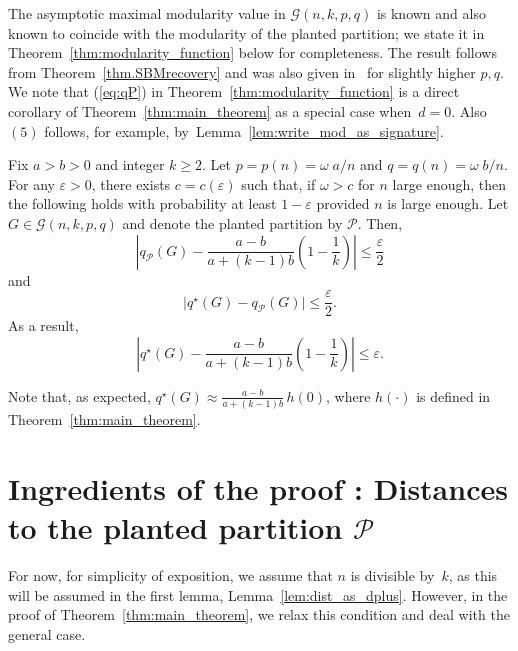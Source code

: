 \documentclass[a4paper,UKenglish,cleveref, autoref, thm-restate,numberwithinsect]{lipics-v2021}
\newcommand{\cP}{\mathcal{P}}
\newcommand{\q}{q^{\star}}
\newcommand{\eps}{\varepsilon}
\begin{document}
The asymptotic maximal modularity value in $\mathcal{G}(n,k,p,q)$ is known and also known to coincide with the modularity of the planted partition; we state it in Theorem~\ref{thm:modularity_function} below for completeness. The result follows from Theorem~\ref{thm.SBMrecovery} and was also given in~\cite{sampling} for slightly higher $p,q$. We note that (\ref{eq:qP}) in Theorem~\ref{thm:modularity_function} is a direct corollary of Theorem~\ref{thm:main_theorem} as a special case when~$d=0$. Also~$(5)$ follows, for example, by~Lemma~\ref{lem:write_mod_as_signature}.

\begin{theorem}\label{thm:modularity_function} 
Fix $a>b>0$ and integer $k\geq 2$. Let $p=p(n)=\omega\; a / n$ and $q=q(n)=\omega \; b/n$. For any $\eps>0$, there exists $c=c(\eps)$ such that, if $\omega>c$ for $n$ large enough, then the following holds with probability at least $1-\eps$ provided $n$ is large enough.
%
Let $G \in \mathcal{G}(n,k,p,q)$ and denote the planted partition by $\cP$. Then,
\begin{equation}\label{eq:qP}
\left| q_\cP(G)  - \frac {a-b}{a+(k-1)b} \left( 1 - \frac {1}{k} \right) \right| \le \frac {\eps}{2}
\end{equation}
and 
\begin{equation}\label{eq:q*}
\Big| q^{\star}(G) - q_\cP(G) \Big| \le \frac {\eps}{2}.
\end{equation}
As a result, 
$$
\left| q^{\star}(G)  - \frac {a-b}{a+(k-1)b} \left( 1 - \frac {1}{k} \right) \right| \le \eps.
$$
\end{theorem}
%
Note that, as expected, $\q(G)\approx \frac {a-b}{a+(k-1)b} 
 \,h(0)$, where $h(\cdot)$ is defined in Theorem~\ref{thm:main_theorem}. 




%

\section{Ingredients of the proof 
: Distances to the planted partition $\cP$}\label{sec:distance}

For now, for simplicity of exposition, we assume that $n$ is divisible by~$k$, as this will be assumed in the first lemma, Lemma~\ref{lem:dist_as_dplus}. However, in the proof of Theorem~\ref{thm:main_theorem}, we relax this condition and deal with the general case. 
\end{document}
